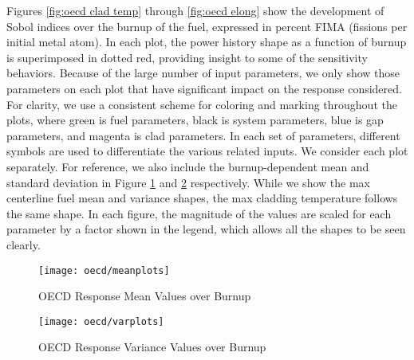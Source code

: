 Figures \ref{fig:oecd clad temp} through \ref{fig:oecd elong} show the development of Sobol indices over the burnup
of the fuel, expressed in percent FIMA (fissions per initial metal atom).  In each plot, the power history
shape as a function of burnup is superimposed in dotted red, providing insight to some of the sensitivity
behaviors.  
Because of the large number of input parameters, we only show those parameters on each plot that
have significant impact on the response considered.  For clarity, we use a consistent scheme for coloring and
marking throughout the plots, where green is fuel parameters, black is system parameters, blue is gap
parameters, and magenta is clad parameters.  In each set of parameters, different symbols are used to
differentiate the various related inputs.  We consider each plot separately.  For reference, we also include
the burnup-dependent mean and standard deviation in Figure \ref{fig:oecd mean} and \ref{fig:oecd var}
respectively.  While we show the max centerline fuel mean and variance shapes, the max cladding temperature
follows the same shape.  In each figure, the magnitude of the values are scaled for each parameter by a factor
shown in the legend, which allows all the shapes to be seen clearly.
\begin{figure}[htb]
  \centering
  \texttt{[image: oecd/meanplots]}
  \caption{OECD Response Mean Values over Burnup}
  \label{fig:oecd mean}
\end{figure}
\begin{figure}[H]
  \centering
  \texttt{[image: oecd/varplots]}
  \caption{OECD Response Variance Values over Burnup}
  \label{fig:oecd var}
\end{figure}


